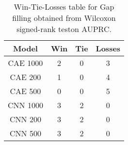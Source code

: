 \begin{table}[H]
\centering
\begin{tabular}{|c|c|c|c|}

\textbf{Model} &  \textbf{Win} &  \textbf{Tie} &  \textbf{Losses} \\
\hline

      CAE 1000 &             2 &             0 &                3 \\
\hline
       CAE 200 &             1 &             0 &                4 \\
\hline
       CAE 500 &             0 &             0 &                5 \\
\hline
      CNN 1000 &             3 &             2 &                0 \\
\hline
       CNN 200 &             3 &             2 &                0 \\
\hline
       CNN 500 &             3 &             2 &                0 \\
\hline

\end{tabular}
\caption{Win-Tie-Losses table for Gap filling obtained from Wilcoxon signed-rank teston AUPRC.}
\label{tab:gap_filling_model_comparison}
\end{table}
